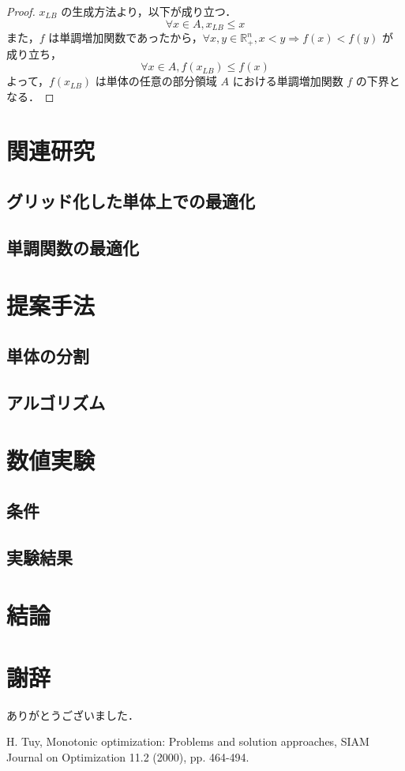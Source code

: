 \documentclass[a4paper,11pt]{jreport}
\begin{document}
\begin{proof}
$ x_{LB} $ の生成方法より，以下が成り立つ．
$$ \forall x \in A, x_{LB} \leq x $$
また，$ f $ は単調増加関数であったから，$ \forall x, y \in \mathbb{R}^n_{+}, x < y \Rightarrow f(x) < f(y) $ が成り立ち，
$$ \forall x \in A, f(x_{LB}) \leq f(x) $$
よって，$ f(x_{LB}) $ は単体の任意の部分領域 $ A $ における単調増加関数 $ f $ の下界となる．\qedhere
\end{proof}

\chapter{関連研究}
\section{グリッド化した単体上での最適化}
\section{単調関数の最適化}


\chapter{提案手法}
\section{単体の分割}
\section{アルゴリズム}

\chapter{数値実験}
\section{条件}
\section{実験結果}

\chapter{結論}

\chapter*{謝辞}

ありがとうございました．

\newpage

\renewcommand{\bibname}{参考文献}

\begin{thebibliography}{1}

H. Tuy,
\newblock Monotonic optimization: Problems and solution approaches,
\newblock SIAM Journal on Optimization 11.2 (2000), pp. 464-494.

\end{thebibliography}
\end{document}
